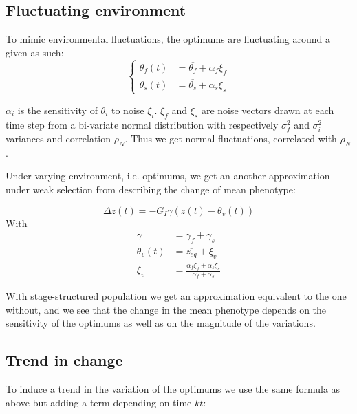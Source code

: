 \subsection*{Fluctuating environment}

To mimic environmental fluctuations, the optimums are fluctuating around a given as such:
\begin{equation}
\left\{
	\begin{aligned}
		\theta_f(t) &= \overline{\theta_f} + \alpha_f \xi_f \\
		\theta_s(t) &= \overline{\theta_s} + \alpha_s \xi_s
	\end{aligned}
\right.
\end{equation}

$\alpha_i$ is the sensitivity of $\theta_i$ to noise $\xi_i$. $\xi_f$ and $\xi_s$ are noise vectors drawn at each time step from a bi-variate normal distribution with respectively $\sigma_f^2$ and $\sigma_i^2$ variances and correlation $\rho_N$. Thus we get normal fluctuations, correlated with $\rho_N$.

Under varying environment, i.e. optimums, we get an another approximation under weak selection from \citep{engen_evolution_2011} describing the change of mean phenotype:

\begin{equation}
	\Delta \overline{z}(t) = - G_I \gamma (\overline{z}(t) - \theta_v(t))
\end{equation}
With
\begin{subequations}
	\begin{align}
		\gamma &= \gamma_f + \gamma_s \\
		\theta_v(t) &= \overline{z_{eq}} + \xi_v \\
		\xi_v &= \frac{\alpha_f \xi_f + \alpha_s \xi_s}{\alpha_f + \alpha_s}
	\end{align}
\end{subequations}

With stage-structured population we get an approximation equivalent to the one without, and we see that the change in the mean phenotype depends on the sensitivity of the optimums as well as on the magnitude of the variations.

\subsection*{Trend in change}

To induce a trend in the variation of the optimums we use the same formula as above but adding a term depending on time $kt$:

